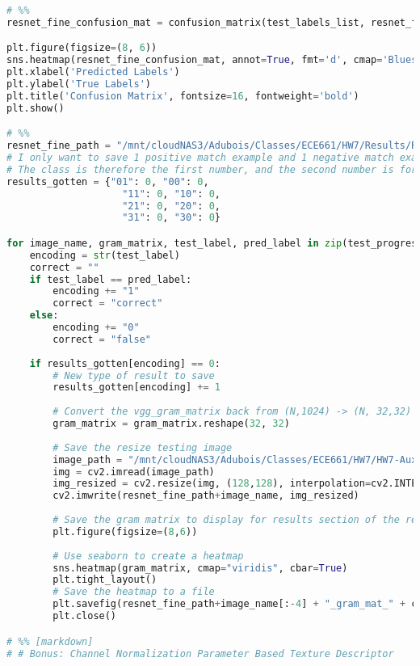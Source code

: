 \documentclass{article}
\begin{document}
\begin{lstlisting}[language=Python]
# %%
resnet_fine_confusion_mat = confusion_matrix(test_labels_list, resnet_fine_predicted_labels)

plt.figure(figsize=(8, 6))
sns.heatmap(resnet_fine_confusion_mat, annot=True, fmt='d', cmap='Blues', cbar=False)
plt.xlabel('Predicted Labels')
plt.ylabel('True Labels')
plt.title('Confusion Matrix', fontsize=16, fontweight='bold')
plt.show()

# %%
resnet_fine_path = "/mnt/cloudNAS3/Adubois/Classes/ECE661/HW7/Results/Resnet_Fine_Results/"
# I only want to save 1 positive match example and 1 negative match example for each class
# The class is therefore the first number, and the second number is for matching labels or not
results_gotten = {"01": 0, "00": 0,
                    "11": 0, "10": 0,
                    "21": 0, "20": 0,
                    "31": 0, "30": 0}

for image_name, gram_matrix, test_label, pred_label in zip(test_progress_bar, test_resnet_fine_gram_matrices, test_labels_list, resnet_fine_predicted_labels):
    encoding = str(test_label)
    correct = ""
    if test_label == pred_label:
        encoding += "1"
        correct = "correct"
    else:
        encoding += "0"
        correct = "false"
    
    if results_gotten[encoding] == 0:
        # New type of result to save
        results_gotten[encoding] += 1
        
        # Convert the vgg_gram_matrix back from (N,1024) -> (N, 32,32) for display
        gram_matrix = gram_matrix.reshape(32, 32)
        
        # Save the resize testing image
        image_path = "/mnt/cloudNAS3/Adubois/Classes/ECE661/HW7/HW7-Auxilliary/data/testing/" + image_name
        img = cv2.imread(image_path)
        img_resized = cv2.resize(img, (128,128), interpolation=cv2.INTER_AREA)
        cv2.imwrite(resnet_fine_path+image_name, img_resized)
        
        # Save the gram matrix to display for results section of the report
        plt.figure(figsize=(8,6))
        
        # Use seaborn to create a heatmap
        sns.heatmap(gram_matrix, cmap="viridis", cbar=True)
        plt.tight_layout()
        # Save the heatmap to a file
        plt.savefig(resnet_fine_path+image_name[:-4] + "_gram_mat_" + correct + ".png", format='png', dpi=300, bbox_inches="tight")
        plt.close()

# %% [markdown]
# # Bonus: Channel Normalization Parameter Based Texture Descriptor


\end{lstlisting}
\end{document}
